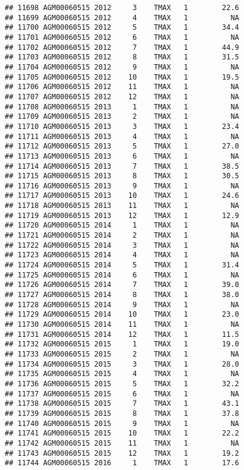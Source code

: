 \documentclass{article}\usepackage[]{graphicx}\usepackage[]{color}
\makeatletter
\newenvironment{kframe}{%
 \def\at@end@of@kframe{}%
 \ifinner\ifhmode%
  \def\at@end@of@kframe{\end{minipage}}%
  \begin{minipage}{\columnwidth}%
 \fi\fi%
 \def\FrameCommand##1{\hskip\@totalleftmargin \hskip-\fboxsep
 \colorbox{shadecolor}{##1}\hskip-\fboxsep
     \hskip-\linewidth \hskip-\@totalleftmargin \hskip\columnwidth}%
 \MakeFramed {\advance\hsize-\width
   \@totalleftmargin\z@ \linewidth\hsize
   \@setminipage}}%
 {\par\unskip\endMakeFramed%
 \at@end@of@kframe}
\newenvironment{knitrout}{}{} %
\makeatother
\begin{document}
\begin{knitrout}
\begin{kframe}
\begin{verbatim}
## 11698 AGM00060515 2012     3    TMAX   1        22.6
## 11699 AGM00060515 2012     4    TMAX   1          NA
## 11700 AGM00060515 2012     5    TMAX   1        34.4
## 11701 AGM00060515 2012     6    TMAX   1          NA
## 11702 AGM00060515 2012     7    TMAX   1        44.9
## 11703 AGM00060515 2012     8    TMAX   1        31.5
## 11704 AGM00060515 2012     9    TMAX   1          NA
## 11705 AGM00060515 2012    10    TMAX   1        19.5
## 11706 AGM00060515 2012    11    TMAX   1          NA
## 11707 AGM00060515 2012    12    TMAX   1          NA
## 11708 AGM00060515 2013     1    TMAX   1          NA
## 11709 AGM00060515 2013     2    TMAX   1          NA
## 11710 AGM00060515 2013     3    TMAX   1        23.4
## 11711 AGM00060515 2013     4    TMAX   1          NA
## 11712 AGM00060515 2013     5    TMAX   1        27.0
## 11713 AGM00060515 2013     6    TMAX   1          NA
## 11714 AGM00060515 2013     7    TMAX   1        38.5
## 11715 AGM00060515 2013     8    TMAX   1        30.5
## 11716 AGM00060515 2013     9    TMAX   1          NA
## 11717 AGM00060515 2013    10    TMAX   1        24.6
## 11718 AGM00060515 2013    11    TMAX   1          NA
## 11719 AGM00060515 2013    12    TMAX   1        12.9
## 11720 AGM00060515 2014     1    TMAX   1          NA
## 11721 AGM00060515 2014     2    TMAX   1          NA
## 11722 AGM00060515 2014     3    TMAX   1          NA
## 11723 AGM00060515 2014     4    TMAX   1          NA
## 11724 AGM00060515 2014     5    TMAX   1        31.4
## 11725 AGM00060515 2014     6    TMAX   1          NA
## 11726 AGM00060515 2014     7    TMAX   1        39.0
## 11727 AGM00060515 2014     8    TMAX   1        38.0
## 11728 AGM00060515 2014     9    TMAX   1          NA
## 11729 AGM00060515 2014    10    TMAX   1        23.0
## 11730 AGM00060515 2014    11    TMAX   1          NA
## 11731 AGM00060515 2014    12    TMAX   1        11.5
## 11732 AGM00060515 2015     1    TMAX   1        19.0
## 11733 AGM00060515 2015     2    TMAX   1          NA
## 11734 AGM00060515 2015     3    TMAX   1        28.0
## 11735 AGM00060515 2015     4    TMAX   1          NA
## 11736 AGM00060515 2015     5    TMAX   1        32.2
## 11737 AGM00060515 2015     6    TMAX   1          NA
## 11738 AGM00060515 2015     7    TMAX   1        43.1
## 11739 AGM00060515 2015     8    TMAX   1        37.8
## 11740 AGM00060515 2015     9    TMAX   1          NA
## 11741 AGM00060515 2015    10    TMAX   1        22.2
## 11742 AGM00060515 2015    11    TMAX   1          NA
## 11743 AGM00060515 2015    12    TMAX   1        19.2
## 11744 AGM00060515 2016     1    TMAX   1        17.6

\end{verbatim}
\end{kframe}
\end{knitrout}
\end{document}
